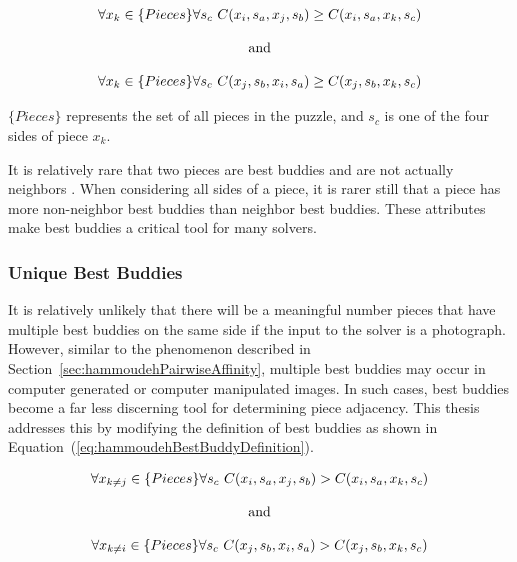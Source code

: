 \documentclass{report}
\def\eref#1{(\ref{#1})}
\begin{document}
\begin{equation} \label{eq:pomeranzBestBuddyDefinition}
\centering
\begin{split}
	\begin{matrix}
		\forall{x_{k} \in \{Pieces\}}\forall{s_c}~C(x_i, s_a, x_j, s_b) \geq C(x_i, s_a, x_k, s_c)
		\\
		\\
		\textnormal{and}
		\\
		\\
		\forall{x_{k} \in \{Pieces\}}\forall{s_c}~C(x_j, s_b, x_i, s_a) \geq C(x_j, s_b, x_k, s_c)
	\end{matrix}
\end{split}
\end{equation}

\noindent
$\{Pieces\}$ represents the set of all pieces in the puzzle, and $s_c$ is one of the four sides of piece $x_k$.

It is relatively rare that two pieces are best buddies and are not actually neighbors \cite{paikin2015}.  When considering all sides of a piece, it is rarer still that a piece has more non-neighbor best buddies than neighbor best buddies.  These attributes make best buddies a critical tool for many solvers.

\subsubsection{Unique Best Buddies}\label{sec:improvedBestBuddies}

It is relatively unlikely that there will be a meaningful number pieces that have multiple best buddies on the same side if the input to the solver is a photograph.  However, similar to the phenomenon described in Section~\ref{sec:hammoudehPairwiseAffinity}, multiple best buddies may occur in computer generated or computer manipulated images.  In such cases, best buddies become a far less discerning tool for determining piece adjacency.  This thesis addresses this by modifying the definition of best buddies as shown in Equation~\eref{eq:hammoudehBestBuddyDefinition}.

\begin{equation} \label{eq:hammoudehBestBuddyDefinition}
\centering
\begin{split}
	\begin{matrix}
		\forall{x_{k \ne j} \in \{Pieces\}}\forall{s_c}~C(x_i, s_a, x_j, s_b) > C(x_i, s_a, x_k, s_c)
		\\
		\\
		\textnormal{and}
		\\
		\\
		\forall{x_{k \ne i} \in \{Pieces\}}\forall{s_c}~C(x_j, s_b, x_i, s_a) > C(x_j, s_b, x_k, s_c)
	\end{matrix}
\end{split}
\end{equation}
\end{document}
